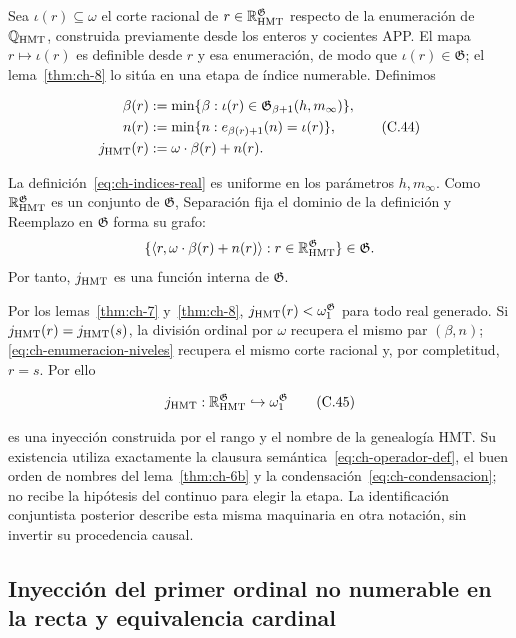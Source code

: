 Sea \(\iota(r)\subseteq\omega\) el corte racional de
\(r\in\mathbb R_{\rm HMT}^{\mathfrak G}\) respecto de la enumeración de
\(\mathbb Q_{\rm HMT}\), construida previamente desde los enteros y cocientes
APP. El mapa \(r\mapsto\iota(r)\) es definible desde \(r\) y esa enumeración,
de modo que \(\iota(r)\in\mathfrak G\); el lema~\ref{thm:ch-8} lo sitúa en una etapa de
índice numerable. Definimos

\[
 \begin{aligned}
  \beta(r)&:=\min\{\beta:
       \iota(r)\in\mathfrak G_{\beta+1}(h,m_\infty)\},\\
  n(r)&:=\min\{n:e_{\beta(r)+1}(n)=\iota(r)\},\\
  j_{\rm HMT}(r)&:=\omega\cdot\beta(r)+n(r).
 \end{aligned}
\tag{C.44}\label{eq:ch-indices-real}
\]

La definición~\eqref{eq:ch-indices-real} es uniforme en los parámetros \(h,m_\infty\). Como
\(\mathbb R_{\rm HMT}^{\mathfrak G}\) es un conjunto de \(\mathfrak G\),
Separación fija el dominio de la definición y Reemplazo en \(\mathfrak G\)
forma su grafo:
\[
 \{\langle r,\omega\cdot\beta(r)+n(r)\rangle:
 r\in\mathbb R_{\rm HMT}^{\mathfrak G}\}\in\mathfrak G.
\]
Por tanto, \(j_{\rm HMT}\) es una función interna de \(\mathfrak G\).

Por los lemas~\ref{thm:ch-7} y~\ref{thm:ch-8},
\(j_{\rm HMT}(r)<\omega_1^{\mathfrak G}\) para todo
real generado. Si \(j_{\rm HMT}(r)=j_{\rm HMT}(s)\), la división ordinal por
\(\omega\) recupera el mismo par \((\beta,n)\); \eqref{eq:ch-enumeracion-niveles} recupera el mismo corte
racional y, por completitud, \(r=s\). Por ello

\[
 j_{\rm HMT}:\mathbb R_{\rm HMT}^{\mathfrak G}
 \hookrightarrow\omega_1^{\mathfrak G}
\tag{C.45}\label{eq:ch-inyeccion-j}
\]

es una inyección construida por el rango y el nombre de la genealogía HMT. Su
existencia utiliza exactamente la clausura semántica~\eqref{eq:ch-operador-def}, el buen orden de
nombres del lema~\ref{thm:ch-6b} y la condensación~\eqref{eq:ch-condensacion}; no recibe la hipótesis del continuo para elegir la
etapa. La identificación conjuntista posterior describe esta misma
maquinaria en otra notación, sin invertir su procedencia causal.

\subsection{Inyección del primer ordinal no numerable en la recta y equivalencia cardinal}

